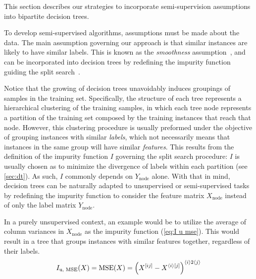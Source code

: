This section describes our strategies to incorporate semi-supervision assumptions into bipartite decision trees.

To develop semi-supervised algorithms, assumptions must be made about the data. The main assumption governing our approach is that similar instances are likely to have similar labels. This is known as the \emph{smoothness} assumption~\cite{chapelle2006semisupervised,vanengelen2020survey}, and can be incorporated into decision trees by redefining the impurity function guiding the split search~\cite{levatic2017semisupervised,adiyeke2022semisupervised,alves2023semisupervised}.

Notice that the growing of decision trees unavoidably induces groupings of samples in the training set. 
Specifically, the structure of each tree represents a hierarchical clustering of the training samples, in which each tree node represents a partition of the training set composed by the training instances that reach that node.
%
However, this clustering procedure is usually preformed under the objective of grouping instances with similar \emph{labels}, which not necessarily means that instances in the same group will have similar \emph{features}.
%
This results from the definition of the impurity function $I$ governing the split search procedure: $I$ is usually chosen as to minimize the divergence of labels within each partition (see \autoref{sec:dt}). As such, $I$ commonly depends on $Y_\text{node}$ alone.
%
With that in mind, decision trees can be naturally adapted to unsupervised or semi-supervised tasks by redefining the impurity function to consider the feature matrix $X_\text{node}$ instead of only the label matrix $Y_\text{node}$.

In a purely unsupervised context, an example would be to utilize the average of column variances in $X_\text{node}$ as the impurity function (\autoref{eq:I u mse}). This would result in a tree that groups instances with similar features together, regardless of their labels.
%
\begin{equation}
    I_\text{u, MSE}(X) = \text{MSE}(X) = \left( X^{[ij]} - X^{\langle i\rangle[j]} \right)^{\langle i\rangle2\langle j\rangle}
    \label{eq:I u mse}
\end{equation}

